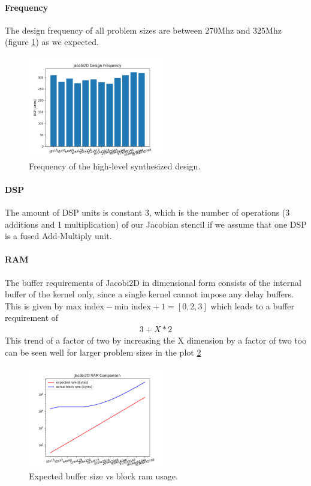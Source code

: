 \paragraph{Frequency}
The design frequency of all problem sizes are between 270Mhz and 325Mhz (figure \ref{fig:jacobi2d_frequency}) as we expected.
\begin{figure}
	\centering
	\includegraphics[height=12em]{plots/jacobi2d_frequency.png}
	\caption{Frequency of the high-level synthesized design.}
	\label{fig:jacobi2d_frequency}
\end{figure}



\paragraph{DSP}
The amount of DSP units is constant 3, which  is the number of operations (3 additions and 1 multiplication) of our Jacobian stencil if we assume that one DSP is a fused Add-Multiply unit.




\paragraph{RAM}
The buffer requirements of Jacobi2D in dimensional form consists of the internal buffer of the kernel only, since a single kernel cannot impose any delay buffers. This is given by $\text{max index} - \text{min index} + 1 = [0, 2, 3]$ which leads to a buffer requirement of
\begin{align}
3 + X*2
\end{align}
This trend of a factor of two by increasing the X dimension by a factor of two too can be seen well for larger  problem sizes in the plot \ref{fig:jacobi2d_ram_comparison}
\begin{figure}[h]
		\centering
		\includegraphics[height=12em]{plots/jacobi2d_ram_comparison.png}
		\caption{Expected buffer size vs block ram usage.}
		\label{fig:jacobi2d_ram_comparison}
\end{figure}


